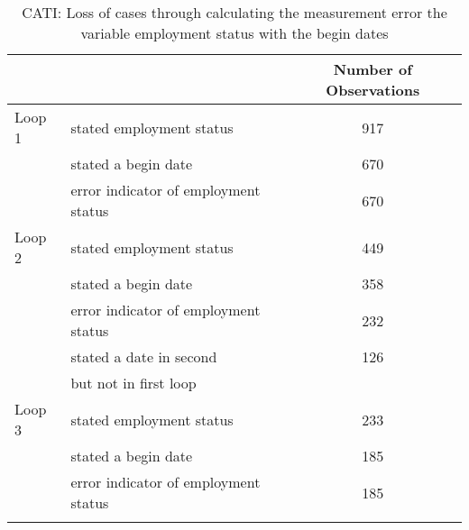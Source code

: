 \begin{table}[h]
\centering
\caption{CATI: Loss of cases through calculating the measurement error the variable employment status with the begin dates}\label{tab:loss of cases cati}
\begin{tabularx}{\textwidth}{Xlc}
\addlinespace \addlinespace
       &                                				 & Number of Observations \\ 
\midrule
\addlinespace
Loop 1 & stated employment status       		&917   \\ \addlinespace
       & stated a begin date           		 	&670   \\ \addlinespace
       & error indicator of employment status 	&670    \\ \addlinespace \addlinespace
\midrule
\addlinespace
Loop 2 & stated employment status       		&449   \\ \addlinespace
       & stated a begin date            		&358   \\ \addlinespace
       & error indicator of employment status 		&232   \\ \addlinespace
       &stated a date in second  				&126   \\
      & but not in first loop                             	&   \\ \addlinespace \addlinespace
\midrule
\addlinespace
Loop 3 & stated employment status       		&233   \\ \addlinespace
       & stated a begin date            	&185   \\ \addlinespace
       & error indicator of employment status 		&185   \\ \addlinespace
 \bottomrule    
\end{tabularx}

\end{table}